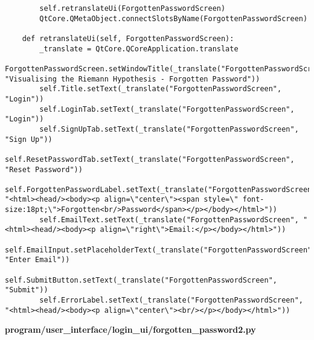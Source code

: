 \documentclass{article}
\begin{document}
\begin{lstlisting}
        self.retranslateUi(ForgottenPasswordScreen)
        QtCore.QMetaObject.connectSlotsByName(ForgottenPasswordScreen)

    def retranslateUi(self, ForgottenPasswordScreen):
        _translate = QtCore.QCoreApplication.translate
        ForgottenPasswordScreen.setWindowTitle(_translate("ForgottenPasswordScreen", "Visualising the Riemann Hypothesis - Forgotten Password"))
        self.Title.setText(_translate("ForgottenPasswordScreen", "Login"))
        self.LoginTab.setText(_translate("ForgottenPasswordScreen", "Login"))
        self.SignUpTab.setText(_translate("ForgottenPasswordScreen", "Sign Up"))
        self.ResetPasswordTab.setText(_translate("ForgottenPasswordScreen", "Reset Password"))
        self.ForgottenPasswordLabel.setText(_translate("ForgottenPasswordScreen", "<html><head/><body><p align=\"center\"><span style=\" font-size:18pt;\">Forgotten<br/>Password</span></p></body></html>"))
        self.EmailText.setText(_translate("ForgottenPasswordScreen", "<html><head/><body><p align=\"right\">Email:</p></body></html>"))
        self.EmailInput.setPlaceholderText(_translate("ForgottenPasswordScreen", "Enter Email"))
        self.SubmitButton.setText(_translate("ForgottenPasswordScreen", "Submit"))
        self.ErrorLabel.setText(_translate("ForgottenPasswordScreen", "<html><head/><body><p align=\"center\"><br/></p></body></html>"))
\end{lstlisting}

\textbf{program/user\_interface/login\_ui/forgotten\_password2.py}
\end{document}
